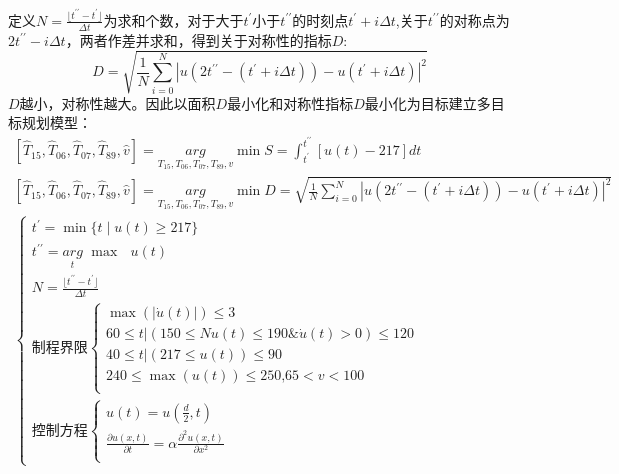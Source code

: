 \documentclass[withoutpreface,bwprint]{cumcmthesis} %
\begin{document}
定义$N=\frac{\lfloor t^{\prime \prime}-t^\prime \rfloor}{\Delta t}$为求和个数，对于大于$t^{\prime}$小于$t^{\prime \prime}$的时刻点$t^{\prime}+i\Delta t$,关于$t^{\prime \prime}$的对称点为$2 t^{\prime \prime}-i\Delta t$，两者作差并求和，得到关于对称性的指标$D$:
\begin{equation}\label{D}
D=\sqrt{\frac{1}{N}\sum_{i=0}^N{\left| u\left( 2t^{\prime\prime}-\left( t^\prime+i\Delta t \right) \right) -u\left( t^\prime+i\Delta t \right) \right|}^2}
\end{equation}
$D$越小，对称性越大。因此以面积$D$最小化和对称性指标$D$最小化为目标建立多目标规划模型：
\begin{equation}\label{p4}
\begin{gathered}
\left[ \hat{T}_{15},\hat{T}_{06},\hat{T}_{07},\hat{T}_{89},\hat{v} \right] =\underset{T_{15},T_{06},T_{07},T_{89},v}{arg}\min S= \int_{t^\prime}^{t^{\prime\prime}}{\left[ u\left( t \right) -217 \right]}dt
\\
\left[ \hat{T}_{15},\hat{T}_{06},\hat{T}_{07},\hat{T}_{89},\hat{v} \right] =\underset{T_{15},T_{06},T_{07},T_{89},v}{arg}\min D=\sqrt{\frac{1}{N}\sum_{i=0}^N{\left| u\left( 2t^{\prime\prime}-\left( t^\prime+i\Delta t \right) \right) -u\left( t^\prime+i\Delta t \right) \right|}^2}
\\
\begin{cases}
t^\prime=\min\text{\{}t\mid u\left( t \right) \ge \text{217\}}\\
t^{\prime\prime}=\underset{t}{arg}\,\,\max\text{ }u\left( t \right)\\
N=\frac{\lfloor t^{\prime\prime}-t^\prime \rfloor}{\Delta t}\\
\text{制程界限}\begin{cases}
\max \left( \left| \dot{u}\left( t \right) \right| \right) \leqslant 3\\
60\leqslant \left. t \right|\left( 150\leqslant Nu\left( t \right) \leqslant \text{190\&}\dot{u}\left( t \right) >0 \right) \leqslant 120\\
40\leqslant \left. t \right|\left( 217\leqslant u\left( t \right) \right) \leqslant 90\\
240\leqslant \max \left( u\left( t \right) \right) \leqslant \text{250,}65<v<100\\
\end{cases}\\
\text{控制方程}\left\{ \begin{array}{l}
u\left( t \right) =u\left( \frac{d}{2},t \right)\\
\frac{\partial u\left( x,t \right)}{\partial t}=\alpha \frac{\partial ^2u\left( x,t \right)}{\partial x^2}\\

\end{array}
\end{cases}
\end{gathered}
\end{equation}
\end{document}
